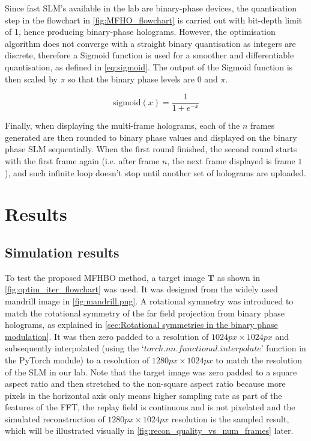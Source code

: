 
	Since fast SLM's available in the lab are binary-phase devices, the quantisation step in the flowchart in \cref{fig:MFHO_flowchart} is carried out with bit-depth limit of 1, hence producing binary-phase holograms. However, the optimisation algorithm does not converge with a straight binary quantisation as integers are discrete, therefore a Sigmoid function \cite{Bacaer2011} is used for a smoother and differentiable quantisation, as defined in \cref{eq:sigmoid}. The output of the Sigmoid function is then scaled by $\pi$ so that the binary phase levels are $0$ and $\pi$.

	\begin{equation}
		\mathrm{sigmoid}(x)=\frac{1}{1+e^{-x}}
		\label{eq:sigmoid}
	\end{equation}

	Finally, when displaying the multi-frame holograms, each of the $n$ frames generated are then rounded to binary phase values and displayed on the binary phase SLM sequentially. When the first round finished, the second round starts with the first frame again (i.e. after frame $n$, the next frame displayed is frame $1$), and such infinite loop doesn't stop until another set of holograms are uploaded.

\section{Results}

\subsection{Simulation results}
	To test the proposed MFHBO method, a target image $\textbf{T}$ as shown in \cref{fig:optim_iter_flowchart} was used. It was designed from the widely used mandrill image \cite{MANDRILL_REF} in \cref{fig:mandrill.png}. A rotational symmetry was introduced to match the rotational symmetry of the far field projection from binary phase holograms, as explained in \cref{sec:Rotational symmetries in the binary phase modulation}. It was then zero padded to a resolution of $1024px\times 1024px$ and subsequently interpolated (using the `$torch.nn.functional.interpolate$' function in the PyTorch module\cite{Paszke2019}) to a resolution of $1280px\times 1024px$ to match the resolution of the SLM in our lab. Note that the target image was zero padded to a square aspect ratio and then stretched to the non-square aspect ratio because more pixels in the horizontal axis only means higher sampling rate as part of the features of the FFT, the replay field is continuous and is not pixelated and the simulated reconstruction of $1280px\times 1024px$ resolution is the sampled result, which will be illustrated visually in \cref{fig:recon_quality_vs_num_frames} later.

